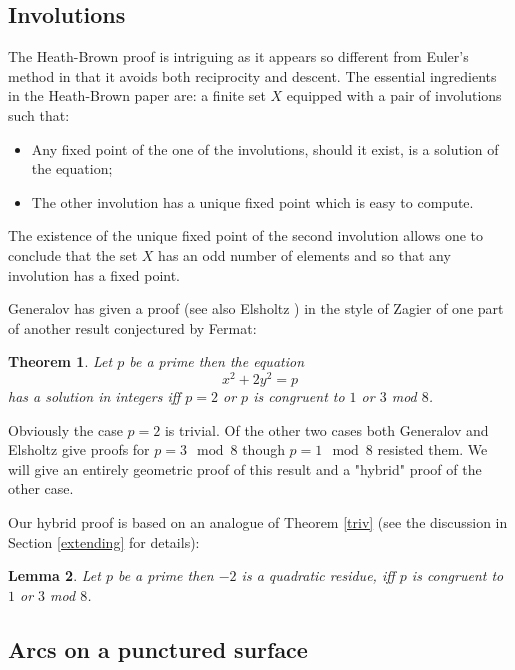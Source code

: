 \documentclass[12pt,a4paper]{amsart}
\newtheorem{thm}{Theorem}[section]
\newtheorem{lem}[thm]{Lemma}
\begin{document}
\subsection{Involutions}

The Heath-Brown proof is intriguing as it appears so different from
Euler's method in that it avoids both reciprocity and descent.
The essential ingredients in the Heath-Brown paper are:
a finite set $X$ equipped with a pair of involutions such that:


\begin{itemize}
	\item Any fixed point of the one of the involutions,
		should it exist, is a solution of the equation;
	\item The other involution has a unique fixed point which is easy to compute.
\end{itemize}

The existence of the unique fixed point of the second involution
allows one to conclude that the set $X$ has an odd number of elements
and so that any involution has a fixed point.


Generalov \cite{generalov} has given a proof (see also Elsholtz \cite{elsholtz}) in the style of Zagier of one part of
another result conjectured by Fermat:

\begin{thm}\label{case m equals 2}
Let $p$ be a prime then the equation
$$x^2 + 2y^2 = p $$
has a solution in integers  
iff  $p =2$ or $p$ is congruent to $1$ or $3$ mod $8$.
\end{thm}

\noindent
Obviously the case $p=2$ is trivial.
Of the other two cases 
both Generalov and Elsholtz give proofs for $p = 3 \mod 8$ 
though $p=1 \mod 8$ resisted them.
We will give an entirely geometric proof of this result and a
"hybrid" proof of the other case.

Our hybrid proof is based on an analogue of Theorem \ref{triv} (see
the discussion in Section \ref{extending} for details):

\begin{lem}\label{analogue for -2}
Let $p$ be a prime then 
$-2$ is a quadratic residue, 
iff  $p$ is congruent to $1$ or $3$ mod $8$.
\end{lem}


\subsection{Arcs on a punctured surface}
\end{document}
